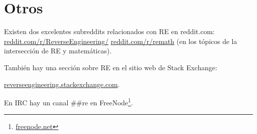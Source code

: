 

\chapter{Otros}

Existen dos excelentes subreddits relacionados con \ac{RE} en reddit.com:
\href{http://go.yurichev.com/17027}{reddit.com/r/ReverseEngineering/} \ESph{}
\href{http://go.yurichev.com/17028}{reddit.com/r/remath}
(en los t\'opicos de la intersecci\'on de \ac{RE} y matem\'aticas).

Tambi\'en hay una secci\'on sobre \ac{RE} en el sitio web de Stack Exchange:

\par
\href{http://go.yurichev.com/17029}{reverseengineering.stackexchange.com}.

En IRC hay un canal \#\#re en
FreeNode\footnote{\href{http://go.yurichev.com/17030}{freenode.net}}.

